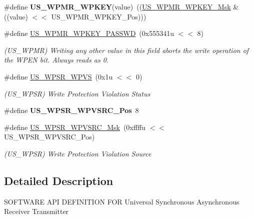 \begin{DoxyCompactItemize}
\mbox{\label{group__SAME70__USART_ga92f71dcb8627780f24fc0bca4fb16f7a}} 
\#define {\bfseries U\+S\+\_\+\+W\+P\+M\+R\+\_\+\+W\+P\+K\+EY}(value)~((\mbox{\hyperlink{group__SAMV71__USART_ga68e18606d5ce0c902f7078f5e84a95b8}{U\+S\+\_\+\+W\+P\+M\+R\+\_\+\+W\+P\+K\+E\+Y\+\_\+\+Msk}} \& ((value) $<$$<$ U\+S\+\_\+\+W\+P\+M\+R\+\_\+\+W\+P\+K\+E\+Y\+\_\+\+Pos)))
\item 
\mbox{\label{group__SAME70__USART_ga5bcadc89cde78bdf6b072773956e7e29}} 
\#define \mbox{\hyperlink{group__SAME70__USART_ga5bcadc89cde78bdf6b072773956e7e29}{U\+S\+\_\+\+W\+P\+M\+R\+\_\+\+W\+P\+K\+E\+Y\+\_\+\+P\+A\+S\+S\+WD}}~(0x555341u $<$$<$ 8)
\begin{DoxyCompactList}\small\item\em (U\+S\+\_\+\+W\+P\+MR) Writing any other value in this field aborts the write operation of the W\+P\+EN bit. Always reads as 0. \end{DoxyCompactList}\item 
\mbox{\label{group__SAME70__USART_gacf130470a00a755e30a2bf46a9ccbbbd}} 
\#define \mbox{\hyperlink{group__SAME70__USART_gacf130470a00a755e30a2bf46a9ccbbbd}{U\+S\+\_\+\+W\+P\+S\+R\+\_\+\+W\+P\+VS}}~(0x1u $<$$<$ 0)
\begin{DoxyCompactList}\small\item\em (U\+S\+\_\+\+W\+P\+SR) Write Protection Violation Status \end{DoxyCompactList}\item 
\mbox{\label{group__SAME70__USART_gac198da9d630bfa55ed0d2ce929f49d73}} 
\#define {\bfseries U\+S\+\_\+\+W\+P\+S\+R\+\_\+\+W\+P\+V\+S\+R\+C\+\_\+\+Pos}~8
\item 
\mbox{\label{group__SAME70__USART_ga4241a13f49c2c191c0080cce67d4aa90}} 
\#define \mbox{\hyperlink{group__SAME70__USART_ga4241a13f49c2c191c0080cce67d4aa90}{U\+S\+\_\+\+W\+P\+S\+R\+\_\+\+W\+P\+V\+S\+R\+C\+\_\+\+Msk}}~(0xffffu $<$$<$ U\+S\+\_\+\+W\+P\+S\+R\+\_\+\+W\+P\+V\+S\+R\+C\+\_\+\+Pos)
\begin{DoxyCompactList}\small\item\em (U\+S\+\_\+\+W\+P\+SR) Write Protection Violation Source \end{DoxyCompactList}\end{DoxyCompactItemize}


\subsection{Detailed Description}
S\+O\+F\+T\+W\+A\+RE A\+PI D\+E\+F\+I\+N\+I\+T\+I\+ON F\+OR Universal Synchronous Asynchronous Receiver Transmitter 
